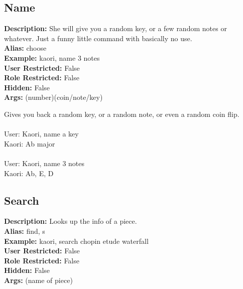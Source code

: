 \documentclass[11pt]{article}
\begin{document}
\subsection{Name}
\textbf{Description: } \hspace{5pt} She will give you a random key, or a few random notes or whatever. Just a funny little command with basically no use. \\
\textbf{Alias: } \hspace{5pt} choose \\
\textbf{Example: } \hspace{5pt} kaori, name 3 notes \\
\textbf{User Restricted: } \hspace{5pt} False\\
\textbf{Role Restricted: } \hspace{5pt} False\\
\textbf{Hidden: } \hspace{5pt} False\\
\textbf{Args: } \hspace{5pt} (number)(coin/note/key)

Gives you back a random key, or a random note, or even a random coin flip.
\\ \\
User: Kaori, name a key
\\ 
Kaori: Ab major
\\ \\
User: Kaori, name 3 notes
\\ 
Kaori: Ab, E, D


\subsection{Search}
\textbf{Description: } \hspace{5pt} Looks up the info of a piece. \\
\textbf{Alias: } \hspace{5pt} find, s \\
\textbf{Example: } \hspace{5pt} kaori, search chopin etude waterfall \\
\textbf{User Restricted: } \hspace{5pt} False\\
\textbf{Role Restricted: } \hspace{5pt} False\\
\textbf{Hidden: } \hspace{5pt} False\\
\textbf{Args: } \hspace{5pt} (name of piece)
\end{document}

